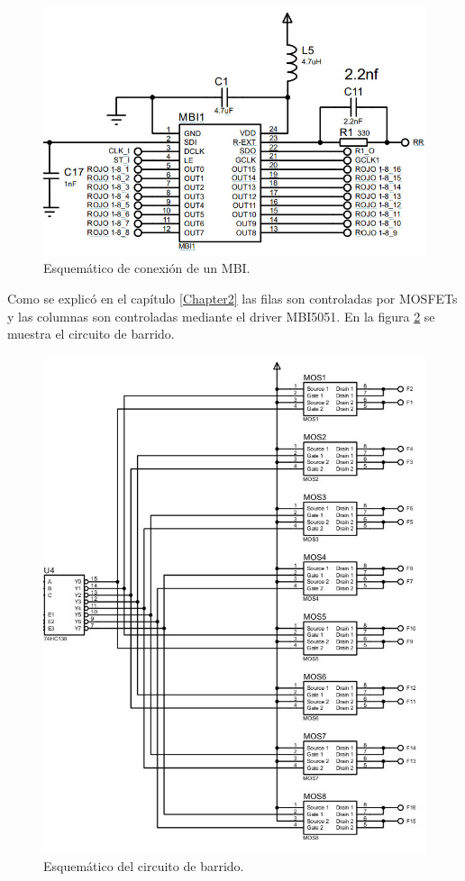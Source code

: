 \begin{figure}[htpb]
	\centering
    \includegraphics[scale=0.4]{Figures/circuitombi.jpg} 
	\caption{Esquemático de conexión de un MBI.}
	\label{fig:circuitombi}
\end{figure}



Como se explicó en el capítulo \ref{Chapter2} las filas son controladas por MOSFETs y las columnas son controladas mediante el driver MBI5051. En la figura \ref{fig:circuitobarrido} se muestra el circuito de barrido. 
\begin{figure}[htpb]
	\centering
    \includegraphics[scale=0.6]{Figures/circuitoBarrido.jpg} 
	\caption{Esquemático del circuito de barrido.}
	\label{fig:circuitobarrido}
\end{figure}




